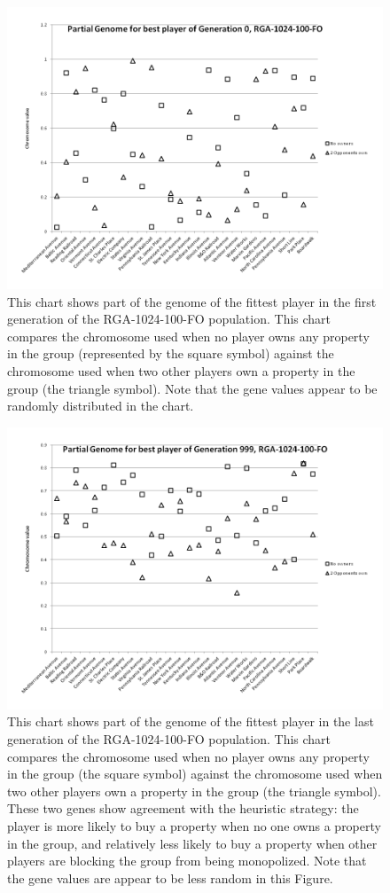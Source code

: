 \begin{figure}[htp]
\centerline{\includegraphics[width=0.75\columnwidth]{Figures/genome000.png}}
\caption[Illustration of Genome, Generation 0]{This chart shows part of the
genome of the fittest player in the first generation of the RGA-1024-100-FO
population. This chart compares the chromosome used when no player owns any
property in the group (represented by the square symbol) against the chromosome
used when two other players own a property in the group (the triangle symbol).
Note that the gene values appear to be randomly distributed in the chart.}
\label{figure-genome0}
\end{figure}

\begin{figure}[htp]
\centerline{\includegraphics[width=0.75\columnwidth]{Figures/genome999.png}}
\caption[Illustration of Genome, Generation 999]{This chart shows part of the
genome of the fittest player in the last generation of the RGA-1024-100-FO
population. This chart compares the chromosome used when no player owns any
property in the group (the square symbol) against the chromosome used when two
other players own a property in the group (the triangle symbol). These two genes
show agreement with the heuristic strategy: the player is more likely to buy a
property when no one owns a property in the group, and relatively less likely to
buy a property when other players are blocking the group from being monopolized.
Note that the gene values are appear to be less random in this Figure.}
\label{figure-genome999}
\end{figure}


